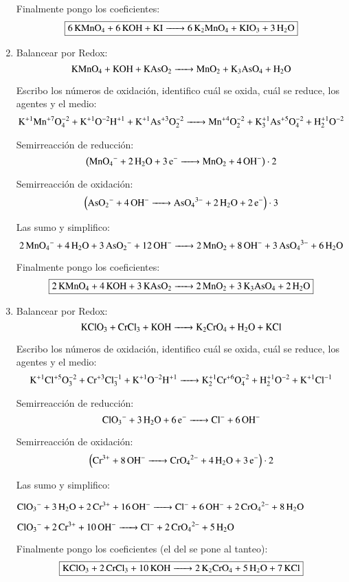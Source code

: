 \begin{enumerate}
Finalmente pongo los coeficientes:
$$\fbox{\ce{
6KMnO4 + 6KOH + KI ->
6K2MnO4 + KIO3 + 3H2O
}}$$


\newpage 
\item
Balancear por Redox:
$$\ce{
KMnO4 + KOH + KAsO2 ->
MnO2 + K3AsO4 + H2O
}$$

Escribo los números de oxidación, identifico cuál se oxida, cuál se reduce, los agentes y el medio:
\[\ce{
K^{+1}Mn^{+7}O^{-2}4 + K^{+1}O^{-2}H^{+1} + K^{+1}As^{+3}O^{-2}2 ->
Mn^{+4}O^{-2}2 + K^{+1}3As^{+5}O^{-2}4 + H^{+1}2O^{-2}
}\]


\begin{multicols}{2}
Semirreacción de reducción:
$$\left(\ce{
MnO4^- + 2H2O + 3e^- ->
MnO2 + 4OH^-
}\right)\cdot 2$$

Semirreacción de oxidación:
$$\left(\ce{
AsO2^- + 4OH^- ->
AsO_4^{3-} + 2H2O + 2e^-
}\right)\cdot 3$$
\end{multicols}

Las sumo y simplifico:
$$\ce{
2MnO4^- + 4 H2O + 3AsO2^- + 12 OH^- ->
2MnO2 + 8OH^- + 3 AsO4^{3-} + 6H2O
}$$

Finalmente pongo los coeficientes:
$$\fbox{\ce{
2KMnO4 + 4KOH + 3KAsO2 ->
2MnO2 + 3K3AsO4 + 2H2O
}}$$


\item
Balancear por Redox:
$$\ce{
KClO3 + CrCl3 + KOH ->
K2CrO4 + H2O + KCl
}$$

Escribo los números de oxidación, identifico cuál se oxida, cuál se reduce, los agentes y el medio:
$$\ce{
K^{+1}Cl^{+5}O^{-2}3 + Cr^{+3}Cl^{-1}3 + K^{+1}O^{-2}H^{+1} ->
K^{+1}2Cr^{+6}O^{-2}4 + H^{+1}2O^{-2} + K^{+1}Cl^{-1}
}$$


\begin{multicols}{2}
Semirreacción de reducción:
$$\ce{
ClO3^- + 3H2O + 6e^- ->
Cl^- + 6OH^-
}$$

Semirreacción de oxidación:
$$\left( \ce{
Cr^{3+} +8OH^- ->
CrO_4^{2-} + 4H2O + 3e^-
}\right) \cdot 2$$
\end{multicols}

Las sumo y simplifico:

\hfil$\ce{
ClO3^- + 3H2O + 2Cr^{3+} + 16OH^- ->
Cl^- + 6OH^- + 2CrO_4^{2-} + 8H2O
}$\hfil

\hfil$\ce{
ClO3^- + 2Cr^{3+} + 10OH^- ->
Cl^- + 2CrO_4^{2-} + 5H2O
}$\hfil

Finalmente pongo los coeficientes (el del  se pone al tanteo):
$$\fbox{\ce{
KClO3 + 2CrCl3 + 10KOH ->
2K2CrO4 + 5H2O + 7KCl
}}$$



\end{enumerate}
